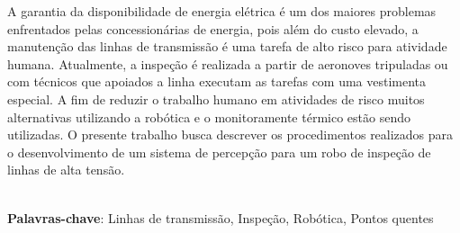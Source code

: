 \begin{thesisresumo}
A garantia da disponibilidade de energia elétrica é um dos maiores problemas enfrentados pelas concessionárias de energia, pois além do custo elevado, a manutenção das linhas de transmissão é uma tarefa de alto risco para atividade humana. Atualmente, a inspeção é realizada a partir de aeronoves tripuladas ou com técnicos que apoiados a linha executam as tarefas com uma vestimenta especial. A fim de reduzir o trabalho humano em atividades de risco muitos alternativas utilizando a robótica e o monitoramente térmico estão sendo utilizadas. O presente trabalho busca descrever os procedimentos realizados para o desenvolvimento de um sistema de percepção para um robo de inspeção de linhas de alta tensão. 

\ \\


\textbf{Palavras-chave}: Linhas de transmissão, Inspeção, Robótica, Pontos quentes

\end{thesisresumo}
